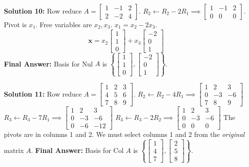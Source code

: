\documentclass[11pt]{article}
\begin{document}
\vspace{0.5cm}
\textbf{Solution 10:}
Row reduce $A = \begin{bmatrix} 1 & -1 & 2 \\ 2 & -2 & 4 \end{bmatrix}$.
$R_2 \leftarrow R_2 - 2R_1 \implies \begin{bmatrix} 1 & -1 & 2 \\ 0 & 0 & 0 \end{bmatrix}$.
Pivot is $x_1$. Free variables are $x_2, x_3$.
$x_1 = x_2 - 2x_3$.
$$ \mathbf{x} = x_2 \begin{bmatrix} 1 \\ 1 \\ 0 \end{bmatrix} + x_3 \begin{bmatrix} -2 \\ 0 \\ 1 \end{bmatrix} $$
\textbf{Final Answer:} Basis for Nul $A$ is $\left\{ \begin{bmatrix} 1 \\ 1 \\ 0 \end{bmatrix}, \begin{bmatrix} -2 \\ 0 \\ 1 \end{bmatrix} \right\}$.

\vspace{0.5cm}
\textbf{Solution 11:}
Row reduce $A = \begin{bmatrix} 1 & 2 & 3 \\ 4 & 5 & 6 \\ 7 & 8 & 9 \end{bmatrix}$.
$R_2 \leftarrow R_2 - 4R_1 \implies \begin{bmatrix} 1 & 2 & 3 \\ 0 & -3 & -6 \\ 7 & 8 & 9 \end{bmatrix}$
$R_3 \leftarrow R_3 - 7R_1 \implies \begin{bmatrix} 1 & 2 & 3 \\ 0 & -3 & -6 \\ 0 & -6 & -12 \end{bmatrix}$
$R_3 \leftarrow R_3 - 2R_2 \implies \begin{bmatrix} 1 & 2 & 3 \\ 0 & -3 & -6 \\ 0 & 0 & 0 \end{bmatrix}$
The pivots are in columns 1 and 2. We must select columns 1 and 2 from the \textit{original} matrix $A$.
\textbf{Final Answer:} Basis for Col $A$ is $\left\{ \begin{bmatrix} 1 \\ 4 \\ 7 \end{bmatrix}, \begin{bmatrix} 2 \\ 5 \\ 8 \end{bmatrix} \right\}$.
\end{document}
